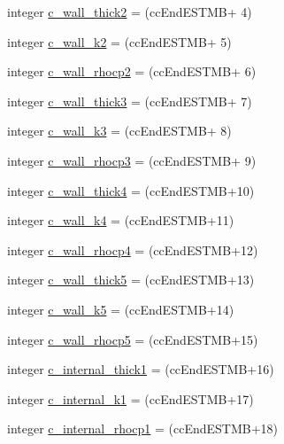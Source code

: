 \begin{DoxyCompactItemize}
\item 
integer \hyperlink{namespaceallocatearray_a20f484b05dbdface58628f54a4c31343}{c\+\_\+wall\+\_\+thick2} = (cc\+End\+E\+S\+T\+MB+ 4)
\item 
integer \hyperlink{namespaceallocatearray_adff19937786a50cb75fdd721405f84f4}{c\+\_\+wall\+\_\+k2} = (cc\+End\+E\+S\+T\+MB+ 5)
\item 
integer \hyperlink{namespaceallocatearray_af2c229fa0f3dc62614415cf32458b8a2}{c\+\_\+wall\+\_\+rhocp2} = (cc\+End\+E\+S\+T\+MB+ 6)
\item 
integer \hyperlink{namespaceallocatearray_ad6febb7b97a4695b1b6e64af1d01b39d}{c\+\_\+wall\+\_\+thick3} = (cc\+End\+E\+S\+T\+MB+ 7)
\item 
integer \hyperlink{namespaceallocatearray_ab7912b232fb3b39abf37efdcb2b7906c}{c\+\_\+wall\+\_\+k3} = (cc\+End\+E\+S\+T\+MB+ 8)
\item 
integer \hyperlink{namespaceallocatearray_ad97c8838bb89895527b446537b3ea2d1}{c\+\_\+wall\+\_\+rhocp3} = (cc\+End\+E\+S\+T\+MB+ 9)
\item 
integer \hyperlink{namespaceallocatearray_a00d3e8b6807cad69955658722fb6dc73}{c\+\_\+wall\+\_\+thick4} = (cc\+End\+E\+S\+T\+MB+10)
\item 
integer \hyperlink{namespaceallocatearray_ae4f8b8b11060d80676b09002f11a32fe}{c\+\_\+wall\+\_\+k4} = (cc\+End\+E\+S\+T\+MB+11)
\item 
integer \hyperlink{namespaceallocatearray_aa36297cd251e35b468d761ad93c91fa3}{c\+\_\+wall\+\_\+rhocp4} = (cc\+End\+E\+S\+T\+MB+12)
\item 
integer \hyperlink{namespaceallocatearray_a5730c33e608715fe74f0b0f0549c1634}{c\+\_\+wall\+\_\+thick5} = (cc\+End\+E\+S\+T\+MB+13)
\item 
integer \hyperlink{namespaceallocatearray_a5b98b9215a2082f2d78493729899d3f8}{c\+\_\+wall\+\_\+k5} = (cc\+End\+E\+S\+T\+MB+14)
\item 
integer \hyperlink{namespaceallocatearray_a37f84d7ca6d321296dc94474f3083069}{c\+\_\+wall\+\_\+rhocp5} = (cc\+End\+E\+S\+T\+MB+15)
\item 
integer \hyperlink{namespaceallocatearray_ac1b54a91457a92d6eb98b0ef303110b1}{c\+\_\+internal\+\_\+thick1} = (cc\+End\+E\+S\+T\+MB+16)
\item 
integer \hyperlink{namespaceallocatearray_a3bf034676d212cb2195d9a262c49554a}{c\+\_\+internal\+\_\+k1} = (cc\+End\+E\+S\+T\+MB+17)
\item 
integer \hyperlink{namespaceallocatearray_ab53123d58659c938997ac4cafa354b59}{c\+\_\+internal\+\_\+rhocp1} = (cc\+End\+E\+S\+T\+MB+18)

\end{DoxyCompactItemize}
